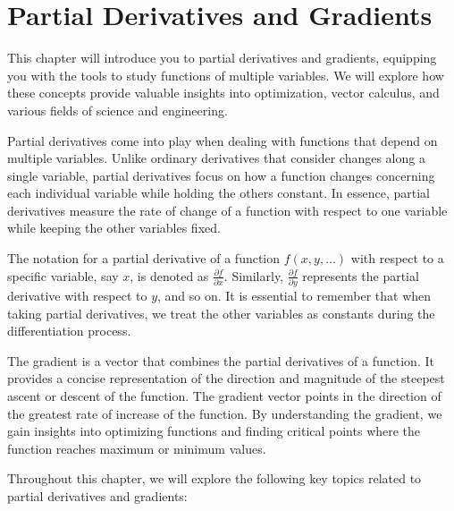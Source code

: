 \chapter{Partial Derivatives and Gradients}

This chapter will introduce you to partial derivatives and gradients,
equipping you with the tools to study functions of multiple
variables. We will explore how these concepts provide valuable
insights into optimization, vector calculus, and various fields of
science and engineering.

Partial derivatives come into play when dealing with functions that
depend on multiple variables. Unlike ordinary derivatives that
consider changes along a single variable, partial derivatives focus on
how a function changes concerning each individual variable while
holding the others constant. In essence, partial derivatives measure
the rate of change of a function with respect to one variable while
keeping the other variables fixed.

The notation for a partial derivative of a function $f(x, y, \ldots)$
with respect to a specific variable, say $x$, is denoted as
$\frac{{\partial f}}{{\partial x}}$. Similarly, $\frac{{\partial
    f}}{{\partial y}}$ represents the partial derivative with respect
to $y$, and so on. It is essential to remember that when taking
partial derivatives, we treat the other variables as constants during
the differentiation process.

The gradient is a vector that combines the partial derivatives of a
function. It provides a concise representation of the direction and
magnitude of the steepest ascent or descent of the function. The
gradient vector points in the direction of the greatest rate of
increase of the function. By understanding the gradient, we gain
insights into optimizing functions and finding critical points where
the function reaches maximum or minimum values.

Throughout this chapter, we will explore the following key topics
related to partial derivatives and gradients:

